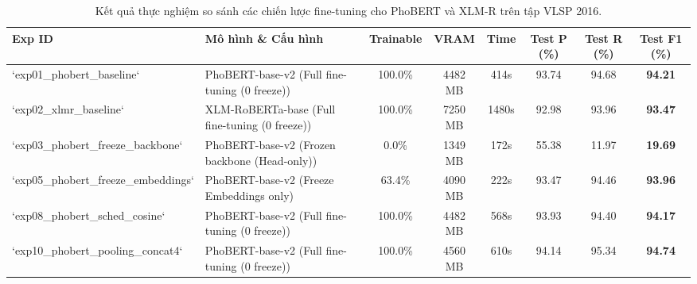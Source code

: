 \begin{table}[t]
\centering
\small
\caption{Kết quả thực nghiệm so sánh các chiến lược fine-tuning cho PhoBERT và XLM-R trên tập VLSP 2016.}
\label{tab:plm_experiments}
\begin{tabular}{llcccccc}
\hline
\textbf{Exp ID} & \textbf{Mô hình \& Cấu hình} & \textbf{Trainable} & \textbf{VRAM} & \textbf{Time} & \textbf{Test P (\%)} & \textbf{Test R (\%)} & \textbf{Test F1 (\%)} \\
\hline
`exp01_phobert_baseline` & PhoBERT-base-v2 (Full fine-tuning (0 freeze)) & 100.0\% & 4482 MB & 414s & 93.74 & 94.68 & \textbf{94.21} \\
`exp02_xlmr_baseline` & XLM-RoBERTa-base (Full fine-tuning (0 freeze)) & 100.0\% & 7250 MB & 1480s & 92.98 & 93.96 & \textbf{93.47} \\
`exp03_phobert_freeze_backbone` & PhoBERT-base-v2 (Frozen backbone (Head-only)) & 0.0\% & 1349 MB & 172s & 55.38 & 11.97 & \textbf{19.69} \\
`exp05_phobert_freeze_embeddings` & PhoBERT-base-v2 (Freeze Embeddings only) & 63.4\% & 4090 MB & 222s & 93.47 & 94.46 & \textbf{93.96} \\
`exp08_phobert_sched_cosine` & PhoBERT-base-v2 (Full fine-tuning (0 freeze)) & 100.0\% & 4482 MB & 568s & 93.93 & 94.40 & \textbf{94.17} \\
`exp10_phobert_pooling_concat4` & PhoBERT-base-v2 (Full fine-tuning (0 freeze)) & 100.0\% & 4560 MB & 610s & 94.14 & 95.34 & \textbf{94.74} \\
\hline
\end{tabular}
\end{table}